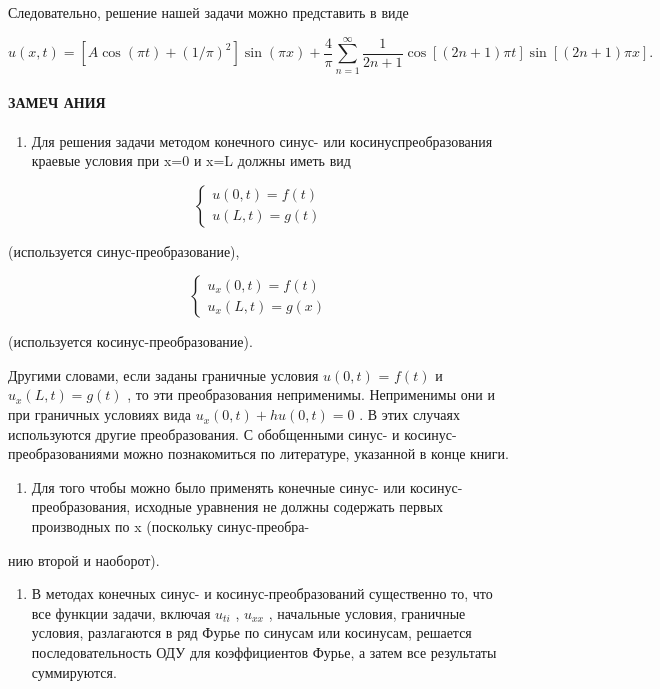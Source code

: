 \documentclass[
  ukrainian,
]{article}
\providecommand{\tightlist}{%
  \setlength{\itemsep}{0pt}\setlength{\parskip}{0pt}}
\begin{document}
Следовательно, решение нашей задачи можно представить в виде

\[
u(x, t) = [A\cos(\pi t) + (1/\pi)^2] \sin(\pi x) + \frac{4}{\pi} \sum_{n=1}^{\infty} \frac{1}{2n+1} \cos[(2n+1)\pi t] \sin[(2n+1)\pi x].
\]

\paragraph{ЗАМЕЧ
АНИЯ}\label{ux437ux430ux43cux435ux447-ux430ux43dux438ux44f}

\begin{enumerate}
\def\labelenumi{\arabic{enumi}.}
\tightlist
\item
  Для решения задачи методом конечного синус- или косинуспреобразования
  краевые условия при x=0 и x=L должны иметь вид
\end{enumerate}

\[
\begin{cases} u(0, t) = f(t) \\ u(L, t) = g(t) \end{cases}
\]

(используется синус-преобразование),

\[
\begin{cases} u_x(0, t) = f(t) \\ u_x(L, t) = g(x) \end{cases}
\]

(используется косинус-преобразование).

Другими словами, если заданы граничные условия \(u(0, t)\) = \(f(t)\) и
\(u_x(L, t) = g(t)\) , то эти преобразования неприменимы. Неприменимы
они и при граничных условиях вида \(u_x(0, t) + hu(0, t) = 0\) . В этих
случаях используются другие преобразования. С обобщенными синус- и
косинус-преобразованиями можно познакомиться по литературе, указанной в
конце книги.

\begin{enumerate}
\def\labelenumi{\arabic{enumi}.}
\setcounter{enumi}{1}
\tightlist
\item
  Для того чтобы можно было применять конечные синус- или
  косинус-преобразования, исходные уравнения не должны содержать первых
  производных по x (поскольку синус-преобра-
\end{enumerate}

нию второй и наоборот).

\begin{enumerate}
\def\labelenumi{\arabic{enumi}.}
\setcounter{enumi}{2}
\tightlist
\item
  В методах конечных синус- и косинус-преобразований существенно то, что
  все функции задачи, включая \(u_{ti}\) , \(u_{xx}\) , начальные
  условия, граничные условия, разлагаются в ряд Фурье по синусам или
  косинусам, решается последовательность ОДУ для коэффициентов Фурье, а
  затем все результаты суммируются.
\end{enumerate}
\end{document}
